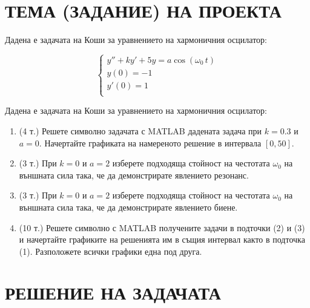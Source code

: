 \documentclass[11pt]{article}
\begin{document}
\section{ТЕМА (ЗАДАНИЕ) НА ПРОЕКТА}
\begin{flushleft}
    Дадена е задачата на Коши за уравнението на хармоничния осцилатор:
\end{flushleft}
$$
\begin{cases}
    y'' + ky' + 5y = a \cos(\omega_0 \, t) \\
    y(0) = -1 \\
    y'(0) = 1 \\
\end{cases}
$$
\begin{flushleft}
    Дадена е задачата на Коши за уравнението на хармоничния осцилатор:
    \begin{enumerate}[label=\arabic*.]
        \item (4 т.) Решете символно задачата с MATLAB дадената задача при $k = 0.3$ и $a = 0$.
        Начертайте графиката на намереното решение в интервала $[0,50]$.
        \item (3 т.) При $k = 0$ и $a = 2$ изберете подходяща стойност на честотата $\omega_0$ на външната сила така, че
        да демонстрирате явлението резонанс.
        \item (3 т.) При $k = 0$ и $a = 2$ изберете подходяща стойност на честотата $\omega_0$ на външната сила така, че
        да демонстрирате явлението биене.
        \item (10 т.) Решете символно с MATLAB получените задачи в подточки (2) и (3) и начертайте графиките
        на решенията им в същия интервал както в подточка (1). Разположете всички графики една под друга.
    \end{enumerate}
\end{flushleft}

\newpage

\section{РЕШЕНИЕ НА ЗАДАЧАТА}
\end{document}
